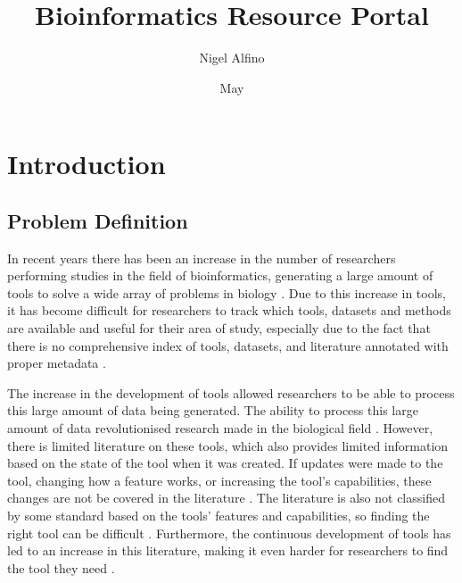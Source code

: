 \documentclass{cisfyp}
\title{Bioinformatics Resource Portal}
\author{Nigel Alfino}
\date{May \the\year}
\begin{document}
\tableofcontents
\listoffigures
\listoftables
\cleardoublepage
{}
\setcounter{page}{1}

\chapter{Introduction}
\label{s:intro}

\section{Problem Definition}
In recent years there has been an increase in the number of researchers performing studies in the field of bioinformatics, generating a large amount of tools to solve a wide array of problems in biology \cite{cannata_merelli_altman_2005}. Due to this increase in tools, it has become difficult for researchers to track which tools, datasets and methods are available and useful for their area of study, especially due to the fact that there is no comprehensive index of tools, datasets, and literature annotated with proper metadata \cite{cannata_merelli_altman_2005}.

The increase in the development of tools allowed researchers to be able to process this large amount of data being generated. The ability to process this large amount of data revolutionised research made in the biological field \cite{tools_science}. However, there is limited literature on these tools, which also provides limited information based on the state of the tool when it was created. If updates were made to the tool, changing how a feature works, or increasing the tool's capabilities, these changes are not be covered in the literature \cite{cannata_merelli_altman_2005}. The literature is also not classified by some standard based on the tools' features and capabilities, so finding the right tool can be difficult \cite{cannata_merelli_altman_2005}. Furthermore, the continuous development of tools has led to an increase in this literature, making it even harder for researchers to find the tool they need \cite{grivell_2002}.
\end{document}

